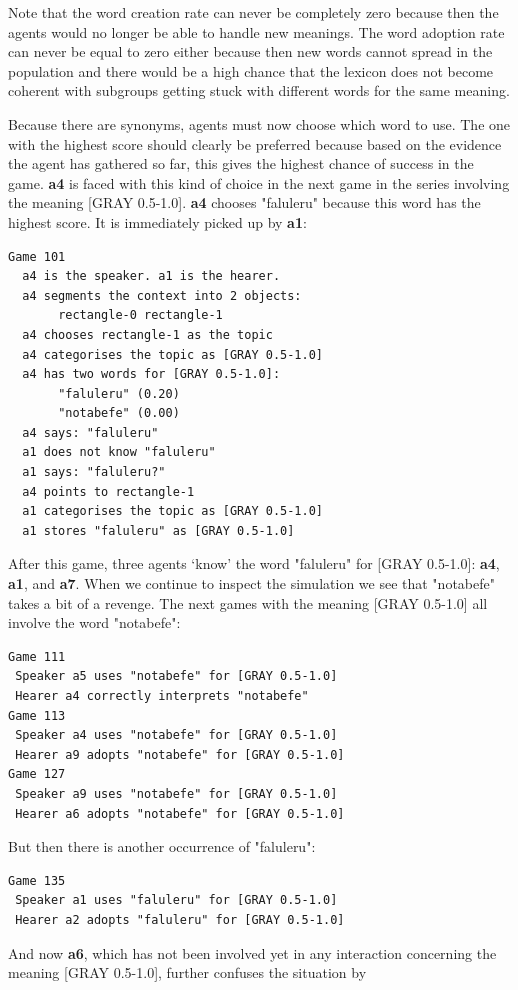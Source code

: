 Note that the word creation 
rate can never be completely zero because then the agents
would no longer be able to handle new meanings. The word 
adoption rate can never be equal to zero either because then 
new words cannot spread in the population and there
would be a high chance that the lexicon does not become coherent
with subgroups getting stuck with different
words for the same meaning. 

Because there are synonyms, agents must now choose
which word to use. The one with the highest
score should clearly be preferred because based on the
evidence the agent has gathered so far, this
gives the highest chance of success in the game. {\bf a4}
is faced with this kind of choice in 
the next game in the series involving the meaning
[GRAY 0.5-1.0]. {\bf a4} chooses "faluleru" because this 
word has the highest score. It is immediately picked up by 
{\bf a1}: 
\begin{verbatim}
Game 101
  a4 is the speaker. a1 is the hearer. 
  a4 segments the context into 2 objects: 
       rectangle-0 rectangle-1
  a4 chooses rectangle-1 as the topic 
  a4 categorises the topic as [GRAY 0.5-1.0]
  a4 has two words for [GRAY 0.5-1.0]:
       "faluleru" (0.20)
       "notabefe" (0.00)
  a4 says: "faluleru"
  a1 does not know "faluleru"
  a1 says: "faluleru?"
  a4 points to rectangle-1
  a1 categorises the topic as [GRAY 0.5-1.0]
  a1 stores "faluleru" as [GRAY 0.5-1.0]
\end{verbatim}
After this game, three agents `know' the word 
"faluleru" for [GRAY 0.5-1.0]: {\bf a4}, {\bf a1}, 
and {\bf a7}. When we continue to inspect the
simulation we see that "notabefe" takes a bit of 
a revenge. The next games with the 
meaning [GRAY 0.5-1.0] all involve the word "notabefe": 
\begin{verbatim}
Game 111
 Speaker a5 uses "notabefe" for [GRAY 0.5-1.0]
 Hearer a4 correctly interprets "notabefe"
Game 113
 Speaker a4 uses "notabefe" for [GRAY 0.5-1.0]
 Hearer a9 adopts "notabefe" for [GRAY 0.5-1.0]
Game 127
 Speaker a9 uses "notabefe" for [GRAY 0.5-1.0]
 Hearer a6 adopts "notabefe" for [GRAY 0.5-1.0]
\end{verbatim}
But then there is another occurrence of "faluleru": 
\begin{verbatim}
Game 135 
 Speaker a1 uses "faluleru" for [GRAY 0.5-1.0]
 Hearer a2 adopts "faluleru" for [GRAY 0.5-1.0]
\end{verbatim}
And now {\bf a6}, which has not been involved 
yet in any interaction concerning the 
meaning [GRAY 0.5-1.0], further confuses the situation by 
